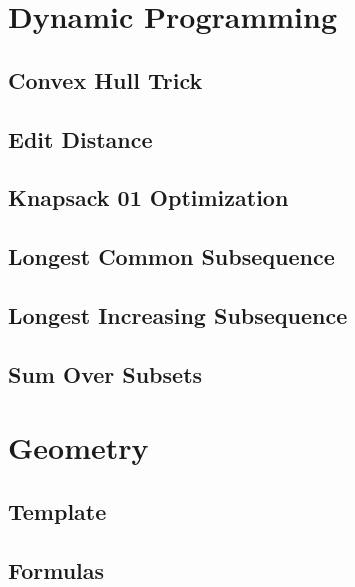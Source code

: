 \section{Dynamic Programming}
\subsection{Convex Hull Trick}
\raggedbottom
\hrulefill
\subsection{Edit Distance}
\raggedbottom
\hrulefill
\subsection{Knapsack 01 Optimization}
\raggedbottom
\hrulefill
\subsection{Longest Common Subsequence}
\raggedbottom
\hrulefill
\subsection{Longest Increasing Subsequence}
\raggedbottom
\hrulefill
\subsection{Sum Over Subsets}
\raggedbottom
\hrulefill

\section{Geometry}
\subsection{Template}
\raggedbottom
\hrulefill
\subsection{Formulas}
\raggedbottom
\hrulefill
